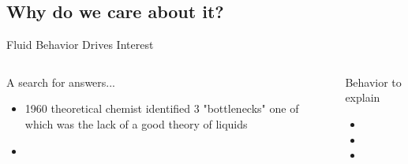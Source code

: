 \documentclass{beamer}
\begin{document}
\subsection*{Why do we care about it?}
\begin{frame}{Fluid Behavior Drives Interest}
	\begin{columns}[t]
		\begin{block}{A search for answers...}
			\begin{itemize}
				\item 1960 theoretical chemist identified 3 "bottlenecks" one of which was the lack of a good theory of liquids 
				\item  
			\end{itemize}
		\end{block}
		\begin{block}{Behavior to explain}
			\begin{itemize}
				\item 
				\item 
				\item 				
			\end{itemize}
		\end{block}		   	 
	\end{columns}	
\end{frame}
\end{document}
